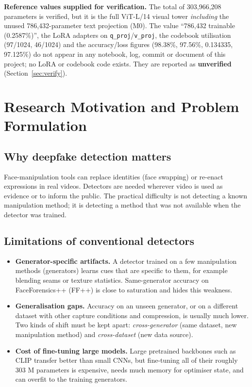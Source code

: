 \documentclass[10pt,a4paper]{article}
\newcommand{\Unv}{\textcolor{fail}{\textbf{unverified}}}
\begin{document}
\textbf{Reference values supplied for verification.} The total of 303,966,208 parameters is
verified, but it is the full ViT-L/14 visual tower \emph{including} the unused 786,432-parameter
text projection (M0). The value ``786,432 trainable (0.2587\%)'', the LoRA adapters on
\texttt{q\_proj}/\texttt{v\_proj}, the codebook utilisation (97/1024, 46/1024) and the
accuracy/loss figures (98.38\%, 97.56\%, 0.134335, 97.125\%) do not appear in any notebook, log,
commit or document of this project; no LoRA or codebook code exists. They are reported as
\Unv{} (Section~\ref{sec:verify}).

\clearpage
\tableofcontents
\clearpage
\listoffigures
\listoftables
\clearpage

\section{Research Motivation and Problem Formulation}\label{sec:motivation}

\subsection{Why deepfake detection matters}
Face-manipulation tools can replace identities (face swapping) or re-enact expressions in real
videos. Detectors are needed wherever video is used as evidence or to inform the public. The
practical difficulty is not detecting a known manipulation method; it is detecting a method that
was not available when the detector was trained.

\subsection{Limitations of conventional detectors}
\begin{itemize}
\item \textbf{Generator-specific artifacts.} A detector trained on a few manipulation methods
(generators) learns cues that are specific to them, for example blending seams or texture
statistics. Same-generator accuracy on FaceForensics++ (FF++) \cite{rossler2019ffpp} is close to
saturation and hides this weakness.
\item \textbf{Generalisation gaps.} Accuracy on an unseen generator, or on a different dataset with
other capture conditions and compression, is usually much lower. Two kinds of shift must be
kept apart: \emph{cross-generator} (same dataset, new manipulation method) and
\emph{cross-dataset} (new data source).
\item \textbf{Cost of fine-tuning large models.} Large pretrained backbones such as CLIP
\cite{radford2021clip} transfer better than small CNNs, but fine-tuning all of their roughly 303 M
parameters is expensive, needs much memory for optimiser state, and can overfit to the training
generators.
\end{itemize}
\end{document}
